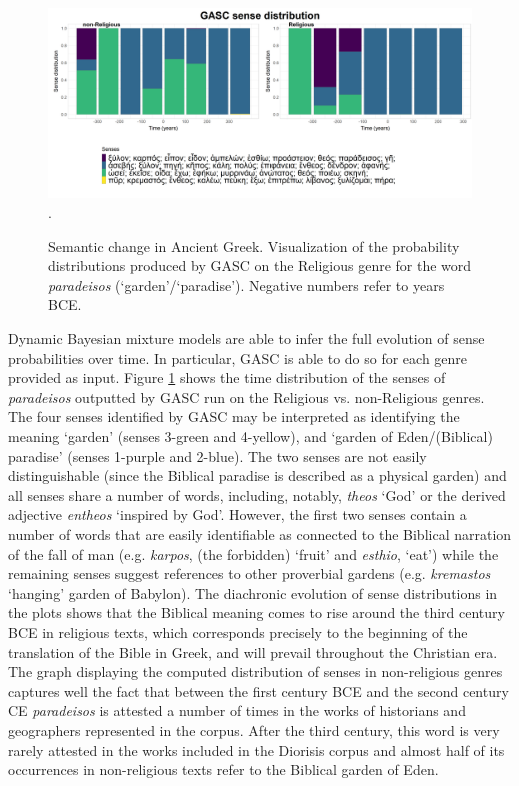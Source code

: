 \documentclass[output=paper]{langscibook}
\begin{document}
\begin{figure}
\includegraphics[width=\textwidth]{figures/PERRONE_paradeisos400AC.png}.
\caption{Semantic change in Ancient Greek. Visualization of the probability distributions produced by GASC on the Religious genre for the word \emph{paradeisos} (`garden'\slash`paradise'). Negative numbers refer to years BCE.\label{paradeisos}}
\end{figure}

\begin{sloppypar}
Dynamic Bayesian mixture models are able to infer the full evolution of sense probabilities over time. In particular, GASC is able to do so for each genre provided as input. Figure \ref{paradeisos} shows the time distribution of the senses of \emph{paradeisos} outputted by GASC run on the Religious vs. non-Religious genres. 
The four senses identified by GASC may be interpreted as identifying the meaning `garden' (senses 3-green and 4-yellow),  and `garden of Eden\slash(Biblical) paradise' (senses 1-purple and 2-blue). The two senses are not easily distinguishable (since the Biblical paradise is described as a physical garden) and all senses share a number of words, including, notably, \emph{theos} `God' or the derived adjective \emph{entheos} `inspired by God'. However, the first two senses contain a number of words that are easily identifiable as connected to the Biblical narration of the fall of man (e.g. \emph{karpos}, (the forbidden) `fruit' and \emph{esthio}, `eat') while the remaining senses suggest references to other proverbial gardens (e.g. \emph{kremastos} `hanging' garden of Babylon). The diachronic evolution of sense distributions in the plots shows that the Biblical meaning comes to rise around the third century BCE in religious texts, which corresponds precisely to the beginning of the translation of the Bible in Greek, and will prevail throughout the Christian era. The graph displaying the computed distribution of senses in non-religious genres captures well the fact that between the first century BCE and the second century CE \emph{paradeisos} is attested a number of times in the works of historians and geographers represented in the corpus. After the third century, this word is very rarely attested in the works included in the Diorisis corpus and almost half of its occurrences in non-religious texts refer to the Biblical garden of Eden.
\end{sloppypar}
\end{document}
